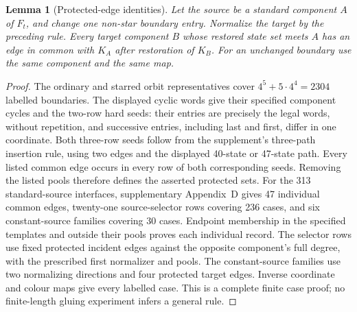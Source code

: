 \documentclass[11pt]{article}
\newtheorem{lemma}[theorem]{Lemma}
\theoremstyle{remark}
\numberwithin{equation}{section}
\numberwithin{table}{section}
\begin{document}
\begin{lemma}[Protected-edge identities]\label{lem:pentagon-protection}
Let the source be a standard component $A$ of $F_t$, and change one
non-star boundary entry. Normalize the target by the preceding rule.
Every target component $B$ whose restored state set meets $A$ has an
edge in common with $K_A$ after restoration of $K_B$.
For an unchanged boundary use the same component and the same map.
\end{lemma}
\begin{proof}
The ordinary and starred orbit representatives cover
$4^5+5\cdot4^4=2304$ labelled boundaries. The displayed cyclic words
give their specified component cycles and the two-row hard seeds:
their entries are precisely the legal words, without repetition,
and successive entries, including last and first, differ in one
coordinate. Both three-row seeds follow from the supplement's
three-path insertion rule, using two edges and the displayed
40-state or 47-state path. Every listed common edge occurs in
every row of both corresponding seeds.
Removing the listed pools therefore defines the asserted protected sets.
For the 313 standard-source interfaces, supplementary Appendix~D gives 47
individual common edges, twenty-one source-selector rows covering 236
cases, and six constant-source families covering 30 cases.
Endpoint membership in the specified templates and outside their pools
proves each individual record. The selector rows use fixed protected
incident edges against the opposite component's full degree, with the
prescribed first normalizer and pools. The constant-source families use
two normalizing directions and four protected target edges. Inverse
coordinate and colour maps give every labelled case. This is a complete
finite case proof; no finite-length gluing experiment infers a general rule.
\end{proof}
\end{document}
